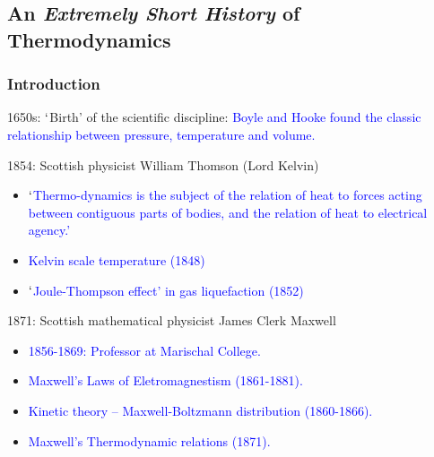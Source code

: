 \documentclass[10pt,compress]{beamer}
\begin{document}
\subsection{An {\it Extremely Short History} of Thermodynamics}
\begin{frame}
 \frametitle{Introduction}

   \begin{block}{1650s: $\lq$Birth' of the scientific discipline:}
   \textcolor{blue}{Boyle and Hooke found the classic relationship between pressure, temperature and volume.}
   \end{block}


   \begin{block}{1854: Scottish physicist William Thomson (Lord Kelvin)}
     \begin{itemize}
       \item \textcolor{blue}{$\lq$Thermo-dynamics is the subject of the relation of heat to forces acting between contiguous parts of bodies, and the relation of heat to electrical agency.'}
       \item \textcolor{blue}{Kelvin scale temperature (1848)}
       \item \textcolor{blue}{$\lq$Joule-Thompson effect' in gas liquefaction (1852)}
     \end{itemize}
   \end{block}

   \begin{block}{1871: Scottish mathematical physicist James Clerk Maxwell}
     \begin{itemize}
       \item \textcolor{blue}{1856-1869: Professor at Marischal College.}
       \item \textcolor{blue}{Maxwell's Laws of Eletromagnestism (1861-1881).}
       \item \textcolor{blue}{Kinetic theory -- Maxwell-Boltzmann distribution (1860-1866).}
       \item \textcolor{blue}{Maxwell's Thermodynamic relations (1871).}
     \end{itemize}
   \end{block}

\end{frame}

\end{document}
